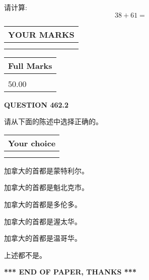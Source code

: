 \documentclass{ctexart}
\begin{document}
  
 
请计算:
\begin{equation}
38 +  %
61 = \nonumber
\end{equation}
 

 

 
  
\vspace{0.2in}
  
\noindent\begin{tabular}{|l|}
\hline
 YOUR MARKS  \\
\hline
 \\ 
 \\ 
\hline
\end{tabular}
\hspace{0.05in} \begin{tabular}{|l|}
\hline
 Full Marks  \\
\hline
 \\ 
50.00 \\
\hline
\end{tabular}
{\textbf{\Large{QUESTION
462.2 
}}}
  
  
请从下面的陈述中选择正确的。
  
  
\noindent\hspace{3.0in} \begin{tabular}{|l|}
\hline
Your choice \\
\hline
 \\ 
 \\ 
\hline
\end{tabular}
  
  
 
 
加拿大的首都是蒙特利尔。
 
 
加拿大的首都是魁北克市。
 
 
加拿大的首都是多伦多。
 
 
加拿大的首都是渥太华。
 
 
加拿大的首都是温哥华。
 
 
 上述都不是。
 
 
   
   
 \vspace{0.2in}
 
   
   
   
   
\vspace{1.0in} 
{\textbf{\large{ *** END OF PAPER, THANKS *** }}} 
   
\end{document}
